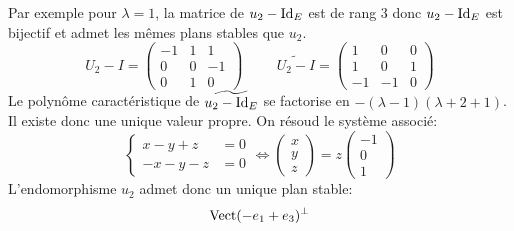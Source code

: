 \begin{enumerate}
\begin{enumerate}
Par exemple pour $\lambda =1$, la matrice de $u_2-\operatorname{Id}_E$ est de rang $3$ donc $u_2-\operatorname{Id}_E$ est bijectif et admet les mêmes plans stables que $u_2$.
\begin{displaymath}
 U_2 - I=
\begin{pmatrix}
 -1 & 1 & 1 \\ 0 & 0 & -1 \\ 0 & 1 & 0
\end{pmatrix}
\hspace{1cm}
\widetilde{U_2 - I}=
\begin{pmatrix}
 1 & 0 & 0 \\ 1 & 0 & 1 \\ -1 & -1 & 0
\end{pmatrix}
\end{displaymath}
Le polynôme caractéristique de $\widetilde{u_2 - \operatorname{Id}_E}$ se factorise en $-(\lambda-1)(\lambda +2+1)$.
Il existe donc une unique valeur propre. On résoud le système associé:
\begin{displaymath}
\left\lbrace 
\begin{aligned}
 x-y+z &=0 \\ -x -y -z &= 0
\end{aligned}
\right. \Leftrightarrow
\begin{pmatrix}
 x \\ y \\ z
\end{pmatrix}
= z
\begin{pmatrix}
 -1 \\ 0 \\ 1
\end{pmatrix} 
\end{displaymath}
 L'endomorphisme $u_2$ admet donc un unique plan stable:
\begin{displaymath}
 \operatorname{Vect}(-e_1 +e_3)^{\perp}
\end{displaymath}
\end{enumerate}

\end{enumerate}
